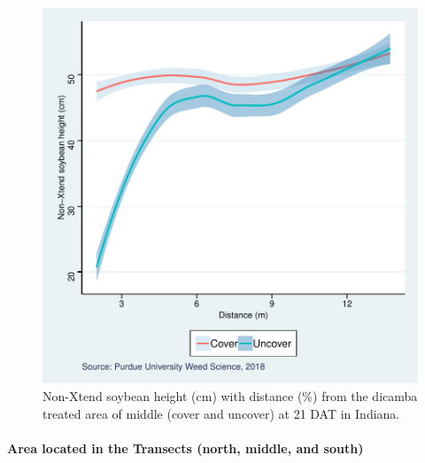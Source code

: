 \documentclass[]{article}
\let\oldparagraph\paragraph
\renewcommand{\paragraph}[1]{\oldparagraph{#1}\mbox{}}
\begin{document}
\begin{figure}
\centering
\includegraphics{Report_Dicamba_study_files/figure-latex/unnamed-chunk-38-1.pdf}
\caption{Non-Xtend soybean height (cm) with distance (\%) from the
dicamba treated area of middle (cover and uncover) at 21 DAT in
Indiana.}
\end{figure}

\pagebreak
\newpage

\paragraph{\texorpdfstring{Area located in the \textbf{Transects}
(north, middle, and
south)}{Area located in the Transects (north, middle, and south)}}\label{area-located-in-the-transects-north-middle-and-south}
\end{document}

